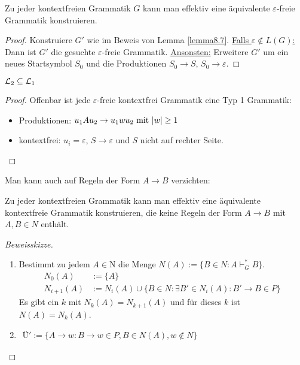 \begin{satz}\label{atz8.9}
	Zu jeder kontextfreien Grammatik $G$ kann man effektiv eine äquivalente $\varepsilon$-freie Grammatik konstruieren.
\end{satz}

\begin{proof}
	Konstruiere $G'$ wie im Beweis von Lemma \ref{lemma8.7}.\nl
	\underline{Falls $\varepsilon\not\in L(G)$:} Dann ist $G'$ die gesuchte $\varepsilon$-freie Grammatik.\nl
	\underline{Ansonsten:} Erweitere $G'$ um ein neues Startsymbol $S_0$ und die Produktionen $S_0\to S$, $S_0\to\varepsilon$.
\end{proof}

\begin{korollar}\label{korollar8.10}
	$\L_2\subseteq \L_1$
\end{korollar}

\begin{proof}
	Offenbar ist jede $\varepsilon$-freie kontextfrei Grammatik eine Typ 1 Grammatik:
	\begin{itemize}
		\item Produktionen: $u_1 A u_2\to u_1 wu_2\mit |w|\geq 1$
		\item kontextfrei: $u_i=\varepsilon$, $S\to\varepsilon$ und $S$ nicht auf rechter Seite.
	\end{itemize}
\end{proof}

Man kann auch auf Regeln der Form $A\to B$ verzichten:

\begin{satz}\label{satz8.11}
	Zu jeder kontextfreien Grammatik kann man effektiv eine äquivalente kontextfreie Grammatik konstruieren, die keine Regeln der Form $A\to B$ mit $A,B\in N$ enthält.
\end{satz}

\begin{proof}[Beweisskizze]\
	\begin{enumerate}
		\item Bestimmt zu jedem $A\in $N die Menge $N(A):=\big\lbrace B\in N:A\vdash_G^\ast B\big\rbrace$.
		\begin{align*}
			N_0(A)&:=\lbrace A\rbrace\\
			N_{i+1}(A)&:=N_i(A)\cup\big\lbrace B\in N:\exists B'\in N_i(A):B'\to B\in P\big\rbrace
		\end{align*}
		Es gibt ein $k$ mit $N_k(A)=N_{k+1}(A)$ und für dieses $k$ ist $N(A)=N_k(A)$.
		\item $\begin{aligned}
			Ü':=\big\lbrace A\to w:B\to w\in P,B\in N(A),w\not\in N\big\rbrace
		\end{aligned}$
	\end{enumerate}
\end{proof}


